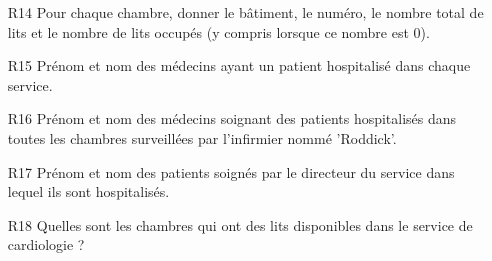 \begin{enumerate}
  \item[R14] Pour chaque chambre, donner le bâtiment, le numéro, le nombre total de lits et le nombre de lits occupés (y compris lorsque ce nombre est 0).
  
  \item[R15] Prénom et nom des médecins ayant un patient hospitalisé dans chaque service.
  
  \item[R16] Prénom et nom des médecins soignant des patients hospitalisés dans toutes les chambres surveillées par l'infirmier nommé 'Roddick'.
  
  \item[R17] Prénom et nom des patients soignés par le directeur du service dans lequel ils sont hospitalisés.
  
  \item[R18] Quelles sont les chambres qui ont des lits disponibles dans le service de cardiologie ?
\end{enumerate}
